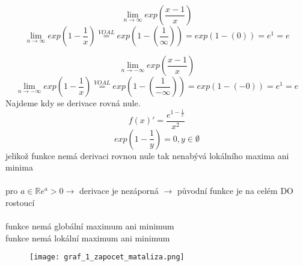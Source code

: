 \documentclass[a4paper,titlepage]{article}
\begin{document}
$$
\lim_{n \to \infty}exp(\frac{x-1}{x})
$$ $$
\lim_{n \to \infty}exp(1-\frac{1}{x}) \stackrel{VOAL}{=} exp(1-(\frac{1}{\infty})) = exp(1-(0))  = e^{1} = e
$$ 

$$
\lim_{n \to -\infty}exp(\frac{x-1}{x})
$$ $$
\lim_{n \to -\infty}exp(1-\frac{1}{x}) \stackrel{VOAL}{=} exp(1-(\frac{1}{-\infty})) = exp(1-(-0))  = e^{1} = e
$$ 
Najdeme kdy se derivace rovná nule.\\
$$ f(x)' = \frac{e^{1-\frac{1}{x}}}{x^2} $$
$$ exp(1-\frac{1}{y}) = 0, y \in \emptyset$$
jelikož funkce nemá derivaci rovnou nule tak nenabývá lokálního maxima ani minima\\
\\
pro $ a \in \mathbb{R}  e^a > 0 \to $ derivace je nezáporná $\to$ původní funkce je na celém DO rostoucí\\
\\
funkce nemá globální maximum ani minimum\\
funkce nemá lokální maximum ani minimum
\begin{figure}[h]
	\texttt{[image: graf\_1\_zapocet\_mataliza.png]}
\end{figure}
\end{document}
